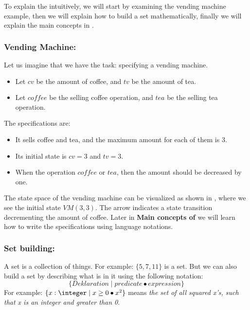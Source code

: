 To explain the \oz{} intuitively, we will start by examining the vending machine example, then we will explain how to build a set mathematically, finally we will explain the main concepts in \oz{}. 

\subsubsection{Vending Machine:}
Let us imagine that we have the task: specifying a vending machine.
\begin{itemize}
\item Let $cv$ be the amount of coffee, and $tv$ be the amount of tea.
\item Let $coffee$ be the selling coffee operation, and $tea$ be the selling tea operation.
\end{itemize}
The specifications are:
\begin{itemize}
\item It sells coffee and tea, and the maximum amount for each of them is 3.
\item Its initial state is  $cv = 3$ and $tv = 3$.
\item When the operation $coffee$ or $tea$, then the amount should be decreased by one.
\end{itemize} 
The state space of the vending machine can be visualized as shown in , where we see the initial state $VM(3,3)$. The arrow indicates a state transition decrementing the amount of coffee. Later in \textbf{Main concepts of \oz{}} we will learn how to write the specifications using \oz{} language notations.


\subsubsection{Set building:} A set is a collection of things. For example: $\{5, 7, 11\}$ is a set.
But we can also build a set by describing what is in it using the following notation: \[\{Deklaration \mid predicate \bullet expression \}\]
 For example: $\{x: \integer \mid x \geq 0 \bullet x^{2}\}$ means \textit{the set of all squared x's, such that x is an integer and greater than 0}.

	
